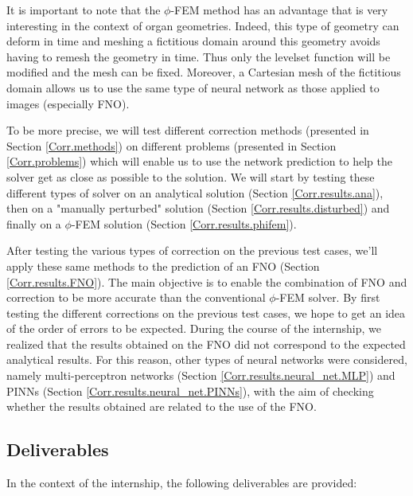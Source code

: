 It is important to note that the $\phi$-FEM method has an advantage that is very interesting in the context of organ geometries. Indeed, this type of geometry can deform in time and meshing a fictitious domain around this geometry avoids having to remesh the geometry in time. Thus only the levelset function will be modified and the mesh can be fixed. Moreover, a Cartesian mesh of the fictitious domain allows us to use the same type of neural network as those applied to images (especially FNO).

To be more precise, we will test different correction methods (presented in Section \ref{Corr.methods}) on different problems (presented in Section \ref{Corr.problems}) which will enable us to use the network prediction to help the solver get as close as possible to the solution. We will start by testing these different types of solver on an analytical solution (Section \ref{Corr.results.ana}), then on a "manually perturbed" solution (Section \ref{Corr.results.disturbed}) and finally on a $\phi$-FEM solution (Section \ref{Corr.results.phifem}).

After testing the various types of correction on the previous test cases, we'll apply these same methods to the prediction of an FNO (Section \ref{Corr.results.FNO}). The main objective is to enable the combination of FNO and correction to be more accurate than the conventional $\phi$-FEM solver. By first testing the different corrections on the previous test cases, we hope to get an idea of the order of errors to be expected. During the course of the internship, we realized that the results obtained on the FNO did not correspond to the expected analytical results. For this reason, other types of neural networks were considered, namely multi-perceptron networks (Section \ref{Corr.results.neural_net.MLP}) and PINNs (Section \ref{Corr.results.neural_net.PINNs}), with the aim of checking whether the results obtained are related to the use of the FNO.

\subsection{Deliverables}

In the context of the internship, the following deliverables are provided:

